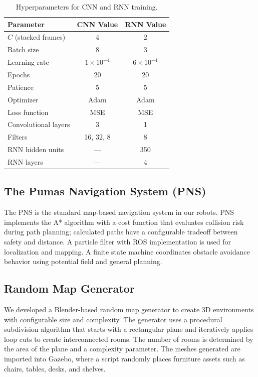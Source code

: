 \documentclass[robotics,article,submit,pdftex,moreauthors]{Definitions/mdpi}
\begin{document}
\begin{table}[htbp]
\centering
\begin{tabular}{|l|c|c|}
\hline
\textbf{Parameter} & \textbf{CNN Value} & \textbf{RNN Value} \\
\hline
$C$ (stacked frames) & 4 & 2 \\
Batch size & 8 & 3 \\
Learning rate & $1 \times 10^{-4}$ & $6 \times 10^{-4}$ \\
Epochs & 20 & 20 \\
Patience & 5 & 5 \\
Optimizer & Adam & Adam \\
Loss function & MSE & MSE \\
Convolutional layers & 3 & 1 \\
Filters & 16, 32, 8 & 8 \\
RNN hidden units & — & 350 \\
RNN layers & — & 4 \\
\hline
\end{tabular}
\vspace{2.5pt}
\caption{Hyperparameters for CNN and RNN training.}
\label{tab:hyperparams}
\end{table}

\subsection{The Pumas Navigation System (PNS)}\label{subsec:pumas_nav}

The PNS \citep{contreras2025b} is the standard map-based navigation system in our robots. PNS implements the A* algorithm with a cost function that evaluates collision risk during path planning; calculated paths have a configurable tradeoff between safety and distance. A particle filter with ROS implementation is used for localization and mapping. A finite state machine coordinates obstacle avoidance behavior using potential field and general planning.

\subsection{Random Map Generator} \label{subsec:random_map}

We developed a Blender-based random map generator to create 3D environments with configurable size and complexity. The generator uses a procedural subdivision algorithm that starts with a rectangular plane and iteratively applies loop cuts to create interconnected rooms. The number of rooms is determined by the area of the plane and a complexity parameter. The meshes generated are imported into Gazebo, where a script randomly places furniture assets such as chairs, tables, desks, and shelves.
\end{document}
